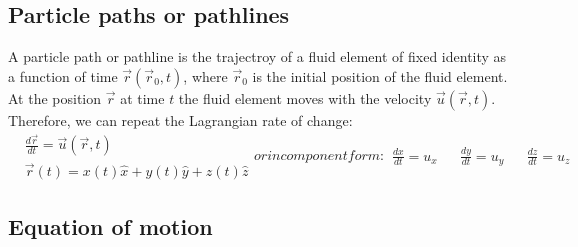 \documentclass[11pt]{article}
\begin{document}
        \subsection{Particle paths or pathlines}\label{subsec:particle-paths-or-pathlines}
            A particle path or pathline is the trajectroy of a fluid element of fixed identity as a function of time $\vec{r}(\vec{r}_0, t)$,
            where $\vec{r}_0$ is the initial position of the fluid element.
            At the position $\vec{r}$ at time $t$ the fluid element moves with the velocity $\vec{u}(\vec{r},t)$.
            Therefore, we can repeat the Lagrangian rate of change:
            \begin{subequations}
                \begin{align*}
                    & \frac{d\vec{r}}{dt} = \vec{u}(\vec{r}, t)\\
                    & \vec{r}(t) = x(t)\hat{x} + y(t)\hat{y} + z(t)\hat{z}
                \end{align*}
                or in component form:
                \begin{align*}
                    \frac{dx}{dt} = u_x && \frac{dy}{dt} = u_y && \frac{dz}{dt} = u_z
                \end{align*}
            \end{subequations}
    \subsection{Equation of motion}\label{subsec:equation-of-motion}
\end{document}
